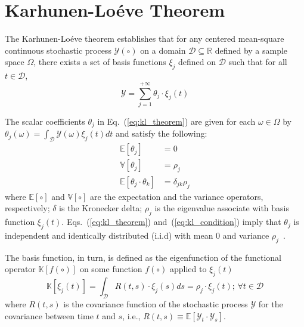 \section{Karhunen-Lo\'eve Theorem}\label{app:kl_theorem}

The Karhunen-Lo\'eve theorem establishes that for any centered mean-square continuous stochastic process $\mathcal{Y}(\circ)$ on a domain $\mathcal{D} \subseteq \mathbb{R}$ defined by a sample space $\Omega$,
there exists a set of basis functions ${\xi_j}$ defined on $\mathcal{D}$ such that for all $t \in \mathcal{D}$,
\begin{equation}
	\mathcal{Y} = \sum_{j=1}^{+\infty} \theta_j \cdot \xi_j(t)
\label{eq:kl_theorem}
\end{equation}

The scalar coefficients $\theta_j$ in Eq.~(\ref{eq:kl_theorem}) are given for each $\omega \in \Omega$ by $\theta_j(\omega) = \int_\mathcal{D} \mathcal{Y}(\omega) \xi_j(t) dt$ and satisfy the following:
\begin{equation}
	\begin{split}
		\mathbb{E}[\theta_j] & = 0 \\
		\mathbb{V}[\theta_j] & = \rho_j \\
    \mathbb{E}[\theta_j\cdot \theta_k] & = \delta_{jk} \rho_j
	\end{split}
\label{eq:kl_condition}
\end{equation}
where $\mathbb{E}[\circ]$ and $\mathbb{V}[\circ]$ are the expectation and the variance operators, respectively;
$\delta$ is the Kronecker delta;
$\rho_j$ is the eigenvalue associate with basis function $\xi_j(t)$.
Eqs.~(\ref{eq:kl_theorem}) and~(\ref{eq:kl_condition}) imply that $\theta_j$ is independent and identically distributed (i.i.d) with mean $0$ and variance $\rho_j$~\cite{Wang2008}.

The basis function, in turn, is defined as the eigenfunction of the functional operator $\mathbb{K}[f(\circ)]$ on some function $f(\circ)$ applied to $\xi_j(t)$
\begin{equation}
	\mathbb{K}[\xi_j(t)] = \int_{\mathcal{D}} R (t, s) \cdot \xi_j(s) ds = \rho_j \cdot \xi_j(t); \, \forall t \in \mathcal{D}
\label{eq:kl_operator}
\end{equation}
where $R (t, s)$ is the covariance function of the stochastic process $\mathcal{Y}$ for the covariance between time $t$ and $s$,
i.e., $R (t, s) \equiv \mathbb{E}[\mathcal{Y}_t \cdot \mathcal{Y}_s]$.

